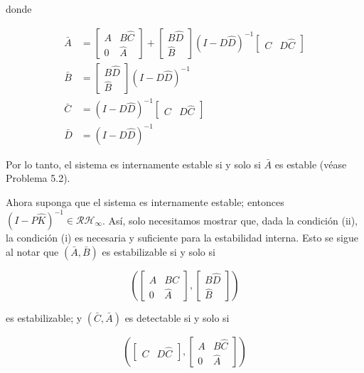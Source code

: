 donde

$$
\begin{aligned}
\bar{A} & =\left[\begin{array}{cc}
A & B \hat{C} \\
0 & \hat{A}
\end{array}\right]+\left[\begin{array}{c}
B \hat{D} \\
\hat{B}
\end{array}\right](I-D \hat{D})^{-1}\left[\begin{array}{ll}
C & D \hat{C}
\end{array}\right] \\
\bar{B} & =\left[\begin{array}{c}
B \hat{D} \\
\hat{B}
\end{array}\right](I-D \hat{D})^{-1} \\
\bar{C} & =(I-D \hat{D})^{-1}\left[\begin{array}{ll}
C & D \hat{C}
\end{array}\right] \\
\bar{D} & =(I-D \hat{D})^{-1}
\end{aligned}
$$

Por lo tanto, el sistema es internamente estable si y solo si $\bar{A}$ es estable (véase Problema 5.2).

Ahora suponga que el sistema es internamente estable; entonces $(I-P \hat{K})^{-1} \in \mathcal{R} \mathcal{H}_{\infty}$. Así, solo necesitamos mostrar que, dada la condición (ii), la condición (i) es necesaria y suficiente para la estabilidad interna. Esto se sigue al notar que $(\bar{A}, \bar{B})$ es estabilizable si y solo si

\[
\left(\left[\begin{array}{cc}
A & B \hat{C}  \tag{5.5}\\
0 & \hat{A}
\end{array}\right],\left[\begin{array}{c}
B \hat{D} \\
\hat{B}
\end{array}\right]\right)
\]

es estabilizable; y $(\bar{C}, \bar{A})$ es detectable si y solo si

\[
\left(\left[\begin{array}{ll}
C & D \hat{C}
\end{array}\right],\left[\begin{array}{cc}
A & B \hat{C}  \tag{5.6}\\
0 & \hat{A}
\end{array}\right]\right)
\]

